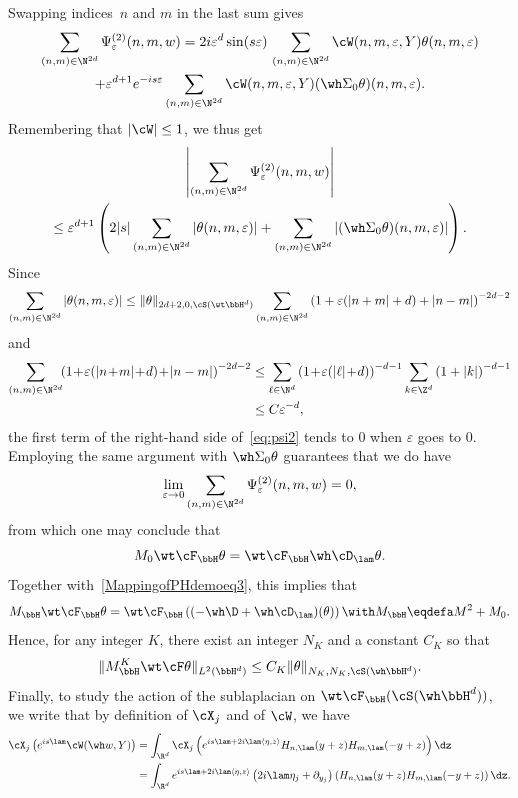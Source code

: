 Swapping indices~$n$ and $m$ in the last sum gives
\begin{multline*}
\sum_{(n,m)\in\N^{2d} } \Psi^{(2)} _\varepsilon(n,m,w) = 2i \varepsilon^d \sin (s\varepsilon)\, \sum_{(n,m)\in\N^{2d} } \cW (n,m,\varepsilon, Y)\theta (n,m,\varepsilon)
\\ + \varepsilon^{d+1} e^{-is\varepsilon} \sum_{(n,m)\in\N^{2d} } \cW (n,m,\varepsilon, Y)(\wh\Sigma_0\theta)(n,m,\varepsilon).
\end{multline*}
Remembering that $|\cW| \leq 1$, we thus get
\begin{multline}\label{eq:psi2}
\left|\sum_{(n,m)\in\N^{2d} } \Psi^{(2)} _\varepsilon(n,m,w) \right|\\ \leq \varepsilon^{d+1}\left(2|s| \sum_{(n,m)\in\N^{2d}}|\theta(n,m,\varepsilon)|+ \sum_{(n,m)\in\N^{2d}} |(\wh\Sigma_0\theta)(n,m,\varepsilon)|\right).
\end{multline}
Since
\[
\sum_{(n,m)\in\N^{2d}}|\theta(n,m,\varepsilon)|\leq \|\theta\|_{2d+2,0,\cS(\wt\bbH^d)}
\sum_{(n,m)\in\N^{2d}} \left(1+\varepsilon(|n+m|+d)+|n-m|\right)^{-2d-2}
\]
and
\[
\begin{aligned}
\sum_{(n,m)\in\N^{2d}} \!\!\left(1\!+\!\varepsilon(|n\!+\!m|\!+\!d)\!+\!|n-m|\right)^{-2d-2} & \leq \sum_{\ell\in\N^{d}} \left(1\!+\!\varepsilon(|\ell|\!+\!d)\right)^{-d-1}
\sum_{k\in\Z^{d}} \left(1+|k|\right)^{-d-1}\\
&\leq C \varepsilon^{-d},
\end{aligned}
\]
the first term of the right-hand side of~\eqref{eq:psi2} tends to $0$ when $\varepsilon$ goes to $0$. Employing the same argument with $\wh\Sigma_0\theta$ guarantees that we do have
\[
\lim_{\varepsilon\rightarrow 0} \sum_{(n,m)\in\N^{2d} } \Psi^{(2)} _\varepsilon(n,m,w) =0,
\]
from which one may conclude that
\[
M_0 \wt\cF_\bbH \theta = \wt\cF_\bbH \wh\cD_\lam \theta.
\]
Together with~\eqref{MappingofPHdemoeq3}, this implies that
\[
M_\bbH \wt\cF_\bbH \theta = \wt\cF_\bbH\left((-\wh \D +\wh\cD_\lam)(\theta)\right)\with M_\bbH\eqdefa M^2+M_0.
\]
Hence, for any integer $K$, there exist an integer $N_K$ and a constant $C_K$ so that
\begin{equation}\label{eq:MK}
\|M_\bbH^K \wt\cF\theta\|_{L^2(\bbH^d)}\leq C_K\|\theta\|_{N_K,N_K,\cS(\wh\bbH^d)}.
\end{equation}
Finally, to study the action of the sublaplacian on $\wt\cF_\bbH(\cS(\wh\bbH^d))$, we write that by definition of $\cX_j$ and of $\cW$, we have
\[
\begin{aligned}
\cX_j \left(e^{is\lam} \cW (\wh w, Y) \right) & = \int_{\R^d} \cX_j \left(e^{is\lam +2i\lam \langle \eta,z\rangle} H_{n,\lam}(y+z) H_{m,\lam} (-y+z)\right) \dz\\
& = \int_{\R^d} e^{is\lam +2i\lam \langle \eta,z\rangle }
\left(2i \lam \eta_j +\partial_{y_j}\right) \left(H_{n,\lam}(y+z) H_{m,\lam} (-y+z)\right) \dz.
\end{aligned}
\]
